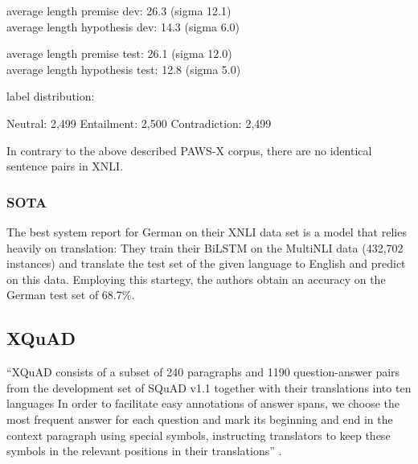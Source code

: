 average length premise dev: 26.3 (sigma 12.1) \\
average length hypothesis dev: 14.3 (sigma 6.0)

average length premise test: 26.1 (sigma 12.0) \\
average length hypothesis test: 12.8 (sigma 5.0)


label distribution:

Neutral: 2,499
Entailment: 2,500
Contradiction: 2,499


In contrary to the above described PAWS-X corpus, there are no identical sentence pairs in XNLI.

\subsubsection{SOTA}

The best system \cite{conneau2018xnli} report for German on their XNLI data set is a model that
relies heavily on translation:
They train their BiLSTM on the MultiNLI data (432,702 instances) and translate the test set of the
given language to English and predict on this data.
Employing this startegy, the authors obtain an accuracy on the German test set of 68.7\%.



\subsection{XQuAD}

``XQuAD consists of a subset of 240 paragraphs and 1190 question-answer pairs from the development
set of SQuAD v1.1 together with their translations into ten languages \textelp{} In order to
facilitate easy annotations of answer spans, we choose the most frequent answer for each question
and mark its beginning and end in the context paragraph using special symbols, instructing
translators to keep these symbols in the relevant positions in their translations''
\cite{artetxe2019cross}.

